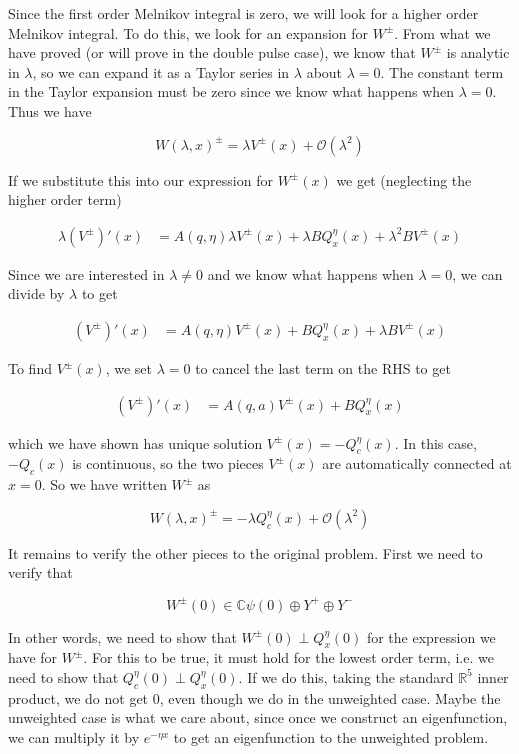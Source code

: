 \documentclass[12pt]{article}
\def\R{{\mathbb R}}
\def\C{{\mathbb C}}
\begin{document}
Since the first order Melnikov integral is zero, we will look for a higher order Melnikov integral. To do this, we look for an expansion for $W^\pm$. From what we have proved (or will prove in the double pulse case), we know that $W^\pm$ is analytic in $\lambda$, so we can expand it as a Taylor series in $\lambda$ about $\lambda = 0$. The constant term in the Taylor expansion must be zero since we know what happens when $\lambda = 0$. Thus we have

\[
W(\lambda, x)^\pm = \lambda V^\pm(x) + \mathcal{O}(\lambda^2)
\]

If we substitute this into our expression for $W^\pm(x)$ we get (neglecting the higher order term)

\begin{align*}
\lambda (V^\pm)'(x) &= A(q, \eta) \lambda V^\pm(x) + \lambda B Q^\eta_x(x) + \lambda^2 B V^\pm(x) 
\end{align*}

Since we are interested in $\lambda \neq 0$ and we know what happens when $\lambda = 0$, we can divide by $\lambda$ to get

\begin{align*}
(V^\pm)'(x) &= A(q, \eta)V^\pm(x) + B Q^\eta_x(x) + \lambda B V^\pm(x) 
\end{align*}

To find $V^\pm(x)$, we set $\lambda = 0$ to cancel the last term on the RHS to get

\begin{align*}
(V^\pm)'(x) &= A(q, a) V^\pm(x) + B Q^\eta_x(x) 
\end{align*}

which we have shown has unique solution $V^\pm(x) = -Q^\eta_c(x)$. In this case, $-Q_c(x)$ is continuous, so the two pieces $V^\pm(x)$ are automatically connected at $x = 0$. So we have written $W^\pm$ as

\[
W(\lambda, x)^\pm = -\lambda Q^\eta_c(x) + \mathcal{O}(\lambda^2)
\]

It remains to verify the other pieces to the original problem. First we need to verify that

\[
W^\pm(0) \in \C \psi(0) \oplus Y^+ \oplus Y^- 
\]

In other words, we need to show that $W^\pm(0) \perp Q^\eta_x(0)$ for the expression we have for $W^\pm$. For this to be true, it must hold for the lowest order term, i.e. we need to show that $Q^\eta_c(0) \perp Q^\eta_x(0)$. If we do this, taking the standard $\R^5$ inner product, we do not get 0, even though we do in the unweighted case. Maybe the unweighted case is what we care about, since once we construct an eigenfunction, we can multiply it by $e^{-\eta x}$ to get an eigenfunction to the unweighted problem. 
\\
\end{document}
